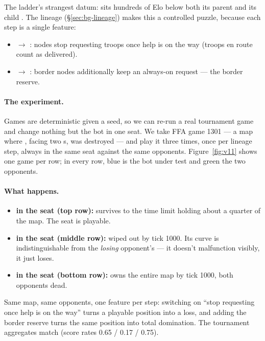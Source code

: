 The ladder's strangest datum:  sits hundreds of Elo below both its
parent  and its child . The lineage
(\S\ref{sec:bg-lineage}) makes this a controlled puzzle, because each step
is a single feature:

\begin{itemize}
  \item {} $\to$ : nodes stop requesting troops once help
    is on the way (troops en route count as delivered).
  \item {} $\to$ : border nodes additionally keep an
    always-on request --- the border reserve.
\end{itemize}

\paragraph{The experiment.} Games are deterministic given a seed, so we can
re-run a real tournament game and change nothing but the bot in one seat.
We take FFA game 1301 --- a map where , facing two s,
was destroyed --- and play it three times, once per lineage step, always in
the same seat against the same opponents. Figure~\ref{fig:v11} shows one
game per row; in every row, blue is the bot under test and green the two
 opponents.

\paragraph{What happens.}
\begin{itemize}
  \item \textbf{ in the seat (top row):} survives to the time
    limit holding about a quarter of the map. The seat is playable.
  \item \textbf{ in the seat (middle row):} wiped out by tick
    1000. Its curve is indistinguishable from the \emph{losing} 
    opponent's --- it doesn't malfunction visibly, it just loses.
  \item \textbf{ in the seat (bottom row):} owns the entire map by
    tick 1000, both opponents dead.
\end{itemize}

Same map, same opponents, one feature per step: switching on
``stop requesting once help is on the way'' turns a playable position into a
loss, and adding the border reserve turns the same position into total
domination. The tournament aggregates match (score rates 0.65 / 0.17 /
0.75).

